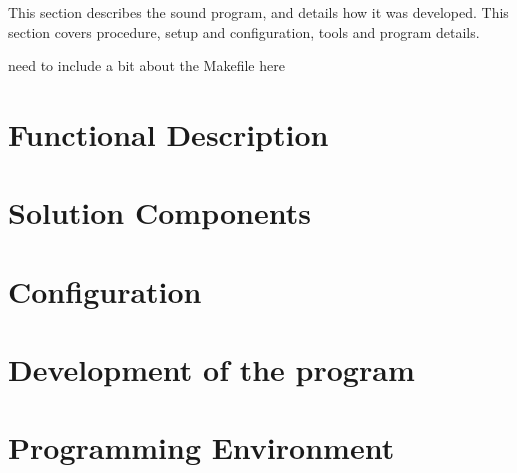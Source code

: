 This section describes the sound program, and details how it was developed. This section covers procedure, setup and configuration, tools and program details.

need to include a bit about the Makefile here

\section{Functional Description}
	

\section{Solution Components}
	

\section{Configuration}
	

\section{Development of the program}
	

\section{Programming Environment}
	

